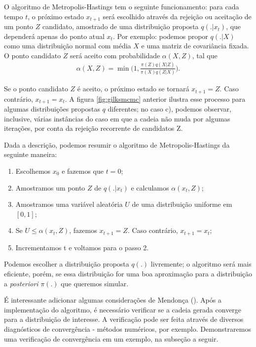 \documentclass[
	12pt,				%
	openright,			%
	twoside,			%
	a4paper,			%
	english,			%
	brazil				%
	]{abntex2}
\begin{document}
\begin{anexosenv}
 O algoritmo de Metropolis-Hastings tem o seguinte funcionamento: para cada tempo $t$, o próximo estado $x_{t+1}$ será escolhido através da rejeição ou aceitação de um ponto $Z$ candidato, amostrado de uma distribuição proposta $q(.|x_{t})$, que dependerá apenas do ponto atual $x_{t}$. Por exemplo: podemos propor $q(.|X)$ como uma distribuição normal com média $X$ e uma matriz de covariância fixada. O ponto candidato $Z$ será aceito com probabilidade $\alpha(X, Z)$, tal que
 \begin{equation}
    \begin{aligned}
        \alpha(X, Z) = \min\bigg(1, \frac{\pi(Z) q(X|Z)}{\pi(X) q(Z|X)}\bigg).
     \end{aligned}
 \end{equation}
 
 Se o ponto candidato $Z$ é aceito, o próximo estado se tornará $x_{t+1} = Z$. Caso contrário, $x_{t+1} = x_{t}$. A figura \ref{fig:gilksmcmc} anterior ilustra esse processo para algumas distribuições propostas $q$ diferentes; no caso c), podemos observar, inclusive, várias instâncias do caso em que a cadeia não muda por algumas iterações, por conta da rejeição recorrente de candidatos Z.
 
 Dada a descrição, podemos resumir o algoritmo de Metropolis-Hastings da seguinte maneira:
 \begin{enumerate}
  \item Escolhemos $x_{0}$ e fazemos que $t = 0$;
  \item Amostramos um ponto $Z$ de $q(.|x_{t})$ e calculamos $\alpha(x_{t}, Z)$;
  \item Amostramos uma variável aleatória $U$ de uma distribuição uniforme em $[0,1]$;
  \item Se $U \leq \alpha(x_{t}, Z)$, fazemos $x_{t+1} = Z$. Caso contrário, $x_{t+1} = x_{t}$;
  \item Incrementamos t e voltamos para o passo 2.
\end{enumerate}
 
 Podemos escolher a distribuição proposta $q(.)$ livremente; o algoritmo será mais eficiente, porém, se essa distribuição for uma boa aproximação para a distribuição a \emph{posteriori} $\pi(.)$ que queremos simular.
 
 É interessante adicionar algumas considerações de Mendonça (\citeyear{mendonca2008}). Após a implementação do algoritmo, é necessário verificar se a cadeia gerada converge para a distribuição de interesse. A verificação pode ser feita através de diversos diagnósticos de convergência - métodos numéricos, por exemplo. Demonstraremos uma verificação de convergência em um exemplo, na subseção a seguir.
 

\end{anexosenv}
\end{document}
